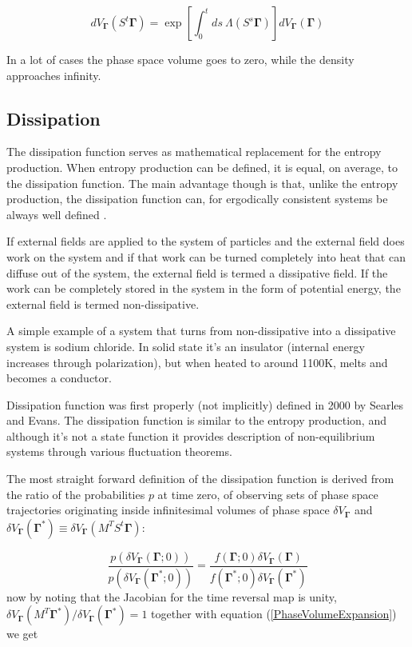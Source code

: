 \documentclass[a4paper,12pt,nofootinbib]{article}
\begin{document}
\begin{equation}
\label{PhaseVolumeExpansion}
  dV_{\bm{\Gamma}}(S^t \bm{\Gamma}) =\exp[\int_0^t ds\ \Lambda(S^s\bm{\Gamma})]dV_{\bm{\Gamma}}(\bm{\Gamma})
\end{equation}
 
In a lot of cases the phase space volume goes to zero, while the density approaches infinity.



\subsection{Dissipation}

The dissipation function serves as mathematical replacement for the entropy production. When entropy production can be defined, it is equal, on average, to the dissipation function. The main advantage though is that, unlike the entropy production, the dissipation function can, for ergodically consistent systems be always well defined \cite{Evans:2016tq}.

If external fields are applied to the system of particles and the external field does work on the system and if that work can be turned completely into heat that can diffuse out of the system, the external field is termed a dissipative field. If the work can be completely stored in the system in the form of potential energy, the external field is termed non-dissipative.

A simple example of a system that turns from non-dissipative into a dissipative system is sodium chloride. In solid state it's an insulator (internal energy increases through polarization), but when heated to around 1100K, melts and becomes a conductor.

Dissipation function was first properly (not implicitly) defined in 2000 by Searles and Evans.
The dissipation function is similar to the entropy production, and although it's not a state function it provides description of non-equilibrium systems through various fluctuation theorems.

The most straight forward definition of the dissipation function is derived from the ratio of the probabilities $p$ at time zero, of observing sets of phase space trajectories originating inside infinitesimal volumes of phase space $\delta V_{\bm{\Gamma}}$ and $\delta V_{\bm{\Gamma}}(\bm{\Gamma}^*)\equiv \delta V_{\bm{\Gamma}}(M^T S^t \bm{\Gamma})$:

\begin{equation}
  \frac{p(\delta V_{\bm{\Gamma}}(\bm{\Gamma};0))}{p(\delta V_{\bm{\Gamma}}(\bm{\Gamma}^*;0))}= \frac{f(\bm{\Gamma};0)\delta V_{\bm{\Gamma}}(\bm{\Gamma})}{f(\bm{\Gamma}^*;0)\delta V_{\bm{\Gamma}}(\bm{\Gamma}^*)}
\end{equation}
now by noting that the Jacobian for the time reversal map is unity, 
\newline $ \delta V_{\bm{\Gamma}}(M^T \bm{\Gamma}^*)/ \delta V_{\bm{\Gamma}}(\bm{\Gamma}^*) =1 $ together with equation (\ref{PhaseVolumeExpansion}) we get
\end{document}
